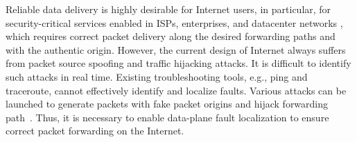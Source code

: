 Reliable data delivery is highly desirable for Internet users, in particular, for security-critical services enabled in ISPs, enterprises, and datacenter networks \cite{zeng2012automatic}, which requires correct packet delivery along the desired forwarding paths and with the authentic origin. 
However, the current design of Internet always suffers from packet source spoofing and traffic hijacking attacks. %
It is difficult to identify such attacks in real time. 
Existing troubleshooting tools, e.g., ping and traceroute, cannot effectively identify and localize faults.  Various attacks can be launched to generate packets with fake packet origins and hijack forwarding path~\cite{kim2014lightweight}. %
Thus, it is necessary to enable data-plane fault localization to ensure correct packet forwarding on the Internet.

